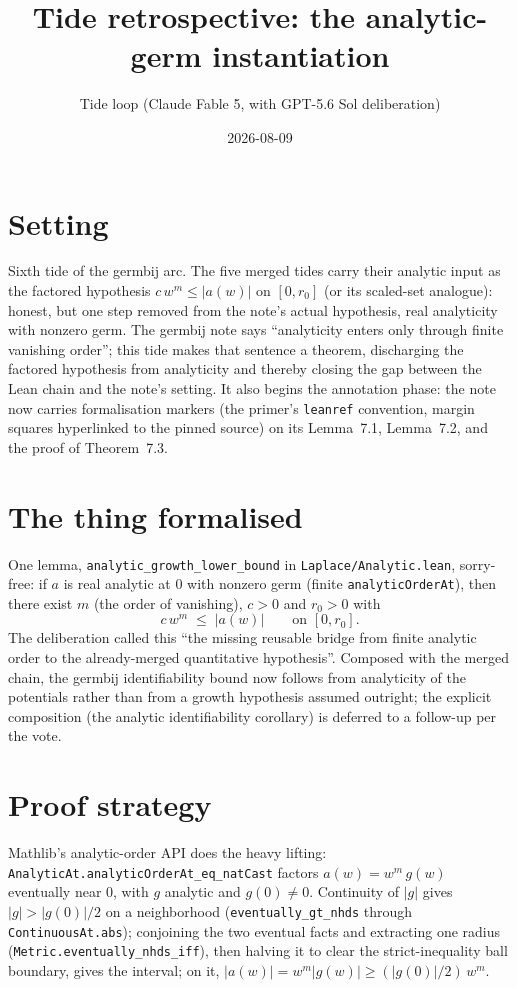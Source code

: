 \documentclass[11pt]{article}
\title{Tide retrospective: the analytic-germ instantiation}
\author{Tide loop (Claude Fable 5, with GPT-5.6 Sol deliberation)}
\date{2026-08-09}
\begin{document}
\maketitle

\section{Setting}

Sixth tide of the germbij arc. The five merged tides carry their analytic
input as the factored hypothesis $c\,w^m \leq |a(w)|$ on $[0, r_0]$ (or its
scaled-set analogue): honest, but one step removed from the note's actual
hypothesis, real analyticity with nonzero germ. The germbij note says
``analyticity enters only through finite vanishing order''; this tide makes
that sentence a theorem, discharging the factored hypothesis from
analyticity and thereby closing the gap between the Lean chain and the
note's setting. It also begins the annotation phase: the note now carries
formalisation markers (the primer's \texttt{leanref} convention, margin
squares hyperlinked to the pinned source) on its Lemma~7.1, Lemma~7.2, and
the proof of Theorem~7.3.

\section{The thing formalised}

One lemma, \texttt{analytic\_growth\_lower\_bound} in
\texttt{Laplace/Analytic.lean}, sorry-free: if $a$ is real analytic at $0$
with nonzero germ (finite \texttt{analyticOrderAt}), then there exist
$m$ (the order of vanishing), $c > 0$ and $r_0 > 0$ with
\[
c\, w^m \;\leq\; |a(w)| \qquad \text{on } [0, r_0].
\]
The deliberation called this ``the missing reusable bridge from finite
analytic order to the already-merged quantitative hypothesis''. Composed
with the merged chain, the germbij identifiability bound now follows from
analyticity of the potentials rather than from a growth hypothesis assumed
outright; the explicit composition (the analytic identifiability corollary)
is deferred to a follow-up per the vote.

\section{Proof strategy}

Mathlib's analytic-order API does the heavy lifting:
\texttt{AnalyticAt.analyticOrderAt\_eq\_natCast} factors
$a(w) = w^m\, g(w)$ eventually near $0$, with $g$ analytic and
$g(0) \neq 0$. Continuity of $|g|$ gives $|g| > |g(0)|/2$ on a
neighborhood (\texttt{eventually\_gt\_nhds} through
\texttt{ContinuousAt.abs}); conjoining the two eventual facts and
extracting one radius (\texttt{Metric.eventually\_nhds\_iff}), then halving
it to clear the strict-inequality ball boundary, gives the interval; on it,
$|a(w)| = w^m |g(w)| \geq (|g(0)|/2)\, w^m$.
\end{document}
